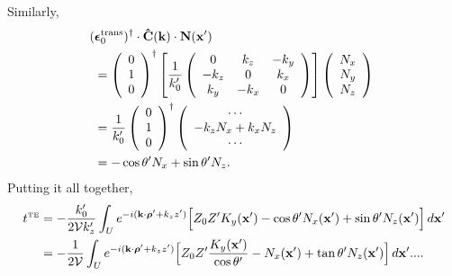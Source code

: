 \documentclass[letterpaper]{article}
\newcommand{\vbEps}{\boldsymbol{\epsilon}}
\begin{document}
Similarly, 
\begin{align*}
&\hspace{-0.05in}
 (\vbEps_0\sups{trans})^\dagger \cdot
 \vbhat{C}(\vb k) \cdot \vb N(\vb x^\prime)
\\
&=
 \left(\begin{array}{c}0 \\ 1 \\ 0\end{array}\right)^\dagger
 \left[ \frac{1}{k_0^{\prime}}
        \left(\begin{array}{ccc}
               0       & k_z     & -k_y    \\
               -k_z    & 0       & k_x     \\
               k_y     & -k_x    & 0
              \end{array}
        \right)
 \right]
 \left(\begin{array}{c}N_x \\ N_y \\ N_z\end{array}\right)
\\
&=
 \frac{1}{k_0^\prime}
 \left(\begin{array}{c}0 \\ 1 \\ 0\end{array}\right)^\dagger
 \left(\begin{array}{c} \cdots \\ -k_z N_x + k_x N_z \\ \cdots
       \end{array}\right)
\\
&=-\cos\theta^\prime N_x + \sin\theta^\prime N_z.
\end{align*}
Putting it all together, 
\begin{align*}
 t^{\hbox{\tiny{TE}}}
&=-\frac{k_0^\prime}{2\mathcal{V} k_z^\prime}
   \int_U e^{-i(\mathbf{k} \cdot \boldsymbol{\rho}^\prime + k_z z^\prime)}
        \Big[ Z_0 Z^\prime K_y(\mathbf{x}^\prime)
               -\cos\theta^\prime N_x(\mathbf{x}^\prime)
               +\sin\theta^\prime N_z(\mathbf{x}^\prime)
        \Big] \, d\mathbf{x}^\prime
\\
&=-\frac{1}{2\mathcal{V}}
   \int_U e^{-i(\mathbf{k} \cdot \boldsymbol{\rho}^\prime + k_z z^\prime)}
        \Big[ Z_0 Z^\prime 
              \frac{ K_y(\mathbf{x}^\prime)}{\cos\theta^\prime}
                    -N_x(\mathbf{x}^\prime)
                    +\tan\theta^\prime N_z(\mathbf{x}^\prime)
        \Big] \, d\mathbf{x}^\prime....
\end{align*}
\end{document}
